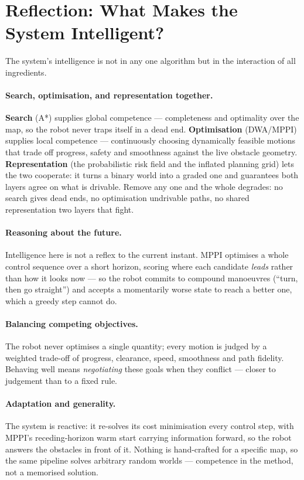 \section{Reflection: What Makes the System Intelligent?}

The system's intelligence is not in any one algorithm but in the interaction of
all ingredients.

\paragraph{Search, optimisation, and representation together.} \textbf{Search} (A*) supplies
global competence --- completeness and optimality over the map, so the robot never traps
itself in a dead end. \textbf{Optimisation} (DWA/MPPI) supplies local competence ---
continuously choosing dynamically feasible motions that trade off progress, safety and
smoothness against the live obstacle geometry. \textbf{Representation} (the probabilistic
risk field and the inflated planning grid) lets the two cooperate: it turns a binary world
into a graded one and guarantees both layers agree on what is drivable. Remove any one and the whole degrades: no search gives dead ends, no optimisation
undrivable paths, no shared representation two layers that fight.

\paragraph{Reasoning about the future.} Intelligence here is not a reflex to the current
instant. MPPI optimises a whole control sequence over a short horizon, scoring where each
candidate \emph{leads} rather than how it looks now --- so the robot commits to compound
manoeuvres (``turn, then go straight'') and accepts a momentarily worse state to reach a
better one, which a greedy step cannot do.

\paragraph{Balancing competing objectives.} The robot never optimises a single quantity;
every motion is judged by a weighted trade-off of progress, clearance, speed, smoothness and
path fidelity. Behaving well means \emph{negotiating} these goals when they conflict ---
closer to judgement than to a fixed rule.

\paragraph{Adaptation and generality.} The system is reactive: it re-solves its cost
minimisation every control step, with MPPI's receding-horizon warm start carrying
information forward, so the robot answers the obstacles in front of it. Nothing is
hand-crafted for a specific map, so the same pipeline solves arbitrary random worlds ---
competence in the method, not a memorised solution.
